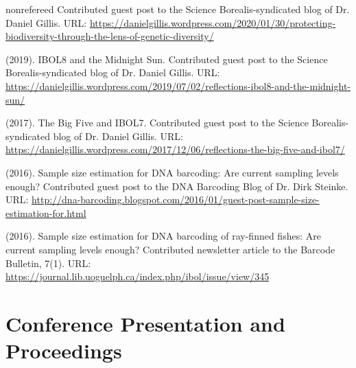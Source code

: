 \begin{revlist}[itemsep=0.45\baselineskip]{nonrefereed}
  Contributed guest post to the Science Borealis-syndicated blog of
  Dr. Daniel Gillis. URL:
  \url{https://danielgillis.wordpress.com/2020/01/30/protecting-biodiversity-through-the-lens-of-genetic-diversity/}
\item \me (2019). IBOL8 and the Midnight Sun. Contributed guest post to the
  Science Borealis-syndicated blog of Dr. Daniel Gillis. URL:
  \url{https://danielgillis.wordpress.com/2019/07/02/reflections-ibol8-and-the-midnight-sun/}
\item \me (2017). The Big Five and IBOL7. Contributed guest post to the Science
  Borealis-syndicated blog of Dr. Daniel Gillis. URL:
  \url{https://danielgillis.wordpress.com/2017/12/06/reflections-the-big-five-and-ibol7/}
\item \me (2016). Sample size estimation for DNA barcoding: Are current sampling
  levels enough? Contributed guest post to the DNA Barcoding Blog of
  Dr. Dirk Steinke. URL:
  \url{http://dna-barcoding.blogspot.com/2016/01/guest-post-sample-size-estimation-for.html}
\item \me (2016). Sample size estimation for DNA barcoding of ray-finned fishes:
  Are current sampling levels enough? Contributed newsletter article to the
  Barcode Bulletin, 7(1). URL:
  \url{https://journal.lib.uoguelph.ca/index.php/ibol/issue/view/345}
\end{revlist}


\section{Conference Presentation and Proceedings}
\legenddirect


